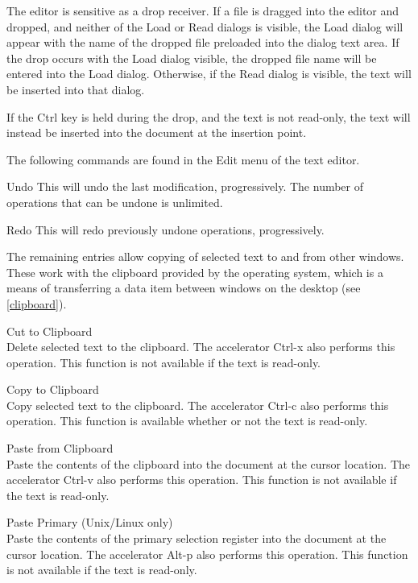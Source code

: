 The editor is sensitive as a drop receiver.  If a file is dragged into
the editor and dropped, and neither of the {\cb Load} or {\cb Read}
dialogs is visible, the {\cb Load} dialog will appear with the name of
the dropped file preloaded into the dialog text area.  If the drop
occurs with the {\cb Load} dialog visible, the dropped file name will
be entered into the {\cb Load} dialog.  Otherwise, if the {\cb Read}
dialog is visible, the text will be inserted into that dialog.

If the {\kb Ctrl} key is held during the drop, and the text is not
read-only, the text will instead be inserted into the document at the
insertion point.

The following commands are found in the {\cb Edit} menu of the
text editor.

\begin{description}
\item{\cb Undo}
This will undo the last modification, progressively.  The number of
operations that can be undone is unlimited.

\item{\cb Redo}
This will redo previously undone operations, progressively.
\end{description}

The remaining entries allow copying of selected text to and from other
windows.  These work with the clipboard provided by the operating
system, which is a means of transferring a data item between windows
on the desktop (see \ref{clipboard}).

\begin{description}
\item{\cb Cut to Clipboard}\\
Delete selected text to the clipboard.  The accelerator {\kb Ctrl-x}
also performs this operation.  This function is not available if the
text is read-only.

\item{\cb Copy to Clipboard}\\
Copy selected text to the clipboard.  The accelerator {\kb Ctrl-c}
also performs this operation.  This function is available whether or
not the text is read-only.

\item{\cb Paste from Clipboard}\\
Paste the contents of the clipboard into the document at the cursor
location.  The accelerator {\kb Ctrl-v} also performs this operation. 
This function is not available if the text is read-only.

\item{\cb Paste Primary} (Unix/Linux only)\\
Paste the contents of the primary selection register into the document
at the cursor location.  The accelerator {\kb Alt-p} also performs
this operation.  This function is not available if the text is
read-only.
\end{description}

